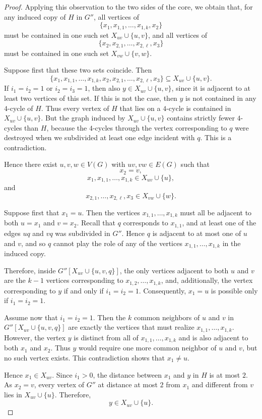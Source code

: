 \documentclass[a4paper,UKenglish,cleveref, autoref, thm-restate]{lipics-v2021}
\begin{document}
\begin{proof}
Applying this observation to the two sides of the core, we obtain that, for any induced copy of $H$ in $G''$, all vertices of
\[
\{x_1,x_{1,1},\ldots,x_{1,k},x_2\}
\]
must be contained in one such set $X_{uv}\cup \{u,v\}$, and all vertices of
\[
\{x_2,x_{2,1},\ldots,x_{2,\ell},x_3\}
\]
must be contained in one such set $X_{vw}\cup \{v,w\}$.

Suppose first that these two sets coincide.
Then
\[
\{x_1,x_{1,1},\ldots,x_{1,k},x_2,x_{2,1},\ldots,x_{2,\ell},x_3\}\subseteq X_{uv}\cup \{u,v\}.
\]
If $i_1=i_2=1$ or $i_2=i_3=1$, then also $y\in X_{uv}\cup \{u,v\}$, since it is adjacent to at least two vertices of this set.
If this is not the case, then $y$ is not contained in any $4$-cycle of $H$.
Thus every vertex of $H$ that lies on a $4$-cycle is contained in $X_{uv}\cup \{u,v\}$.
But the graph induced by $X_{uv}\cup \{u,v\}$ contains strictly fewer $4$-cycles than $H$, because the $4$-cycles through the vertex corresponding to $q$ were destroyed when we subdivided at least one edge incident with $q$.
This is a contradiction.

Hence there exist $u,v,w\in V(G)$ with $uv,vw\in E(G)$ such that
\[
x_2=v,
\]
\[
x_1,x_{1,1},\ldots,x_{1,k}\in X_{uv}\cup \{u\},
\]
and
\[
x_{2,1},\ldots,x_{2,\ell},x_3\in X_{vw}\cup \{w\}.
\]

Suppose first that $x_1=u$.
Then the vertices $x_{1,1},\ldots,x_{1,k}$ must all be adjacent to both $u=x_1$ and $v=x_2$.
Recall that $q$ corresponds to $x_{1,1}$, and at least one of the edges $uq$ and $vq$ was subdivided in $G''$.
Hence $q$ is adjacent to at most one of $u$ and $v$, and so $q$ cannot play the role of any of the vertices $x_{1,1},\ldots,x_{1,k}$ in the induced copy.

Therefore, inside $G''[X_{uv}\cup \{u,v,q\}]$, the only vertices adjacent to both $u$ and $v$ are the $k-1$ vertices corresponding to $x_{1,2},\ldots,x_{1,k}$, and, additionally, the vertex corresponding to $y$ if and only if $i_1=i_2=1$.
Consequently, $x_1=u$ is possible only if $i_1=i_2=1$.

Assume now that $i_1=i_2=1$.
Then the $k$ common neighbors of $u$ and $v$ in $G''[X_{uv}\cup \{u,v,q\}]$ are exactly the vertices that must realize $x_{1,1},\ldots,x_{1,k}$.
However, the vertex $y$ is distinct from all of $x_{1,1},\ldots,x_{1,k}$ and is also adjacent to both $x_1$ and $x_2$.
Thus $y$ would require one more common neighbor of $u$ and $v$, but no such vertex exists.
This contradiction shows that $x_1\neq u$.

Hence $x_1\in X_{uv}$.
Since $i_1>0$, the distance between $x_1$ and $y$ in $H$ is at most $2$.
As $x_2=v$, every vertex of $G''$ at distance at most $2$ from $x_1$ and different from $v$ lies in $X_{uv}\cup \{u\}$.
Therefore,
\[
y\in X_{uv}\cup \{u\}.
\]


\end{proof}
\end{document}
